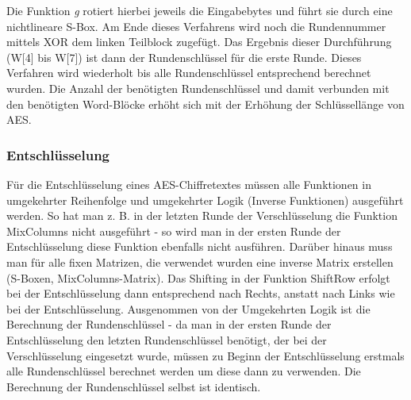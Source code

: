\documentclass[10pt, a4paper,headsepline]{scrreprt}
\begin{document}
Die Funktion \textit{g} rotiert hierbei jeweils die Eingabebytes und führt sie durch eine nichtlineare S-Box. Am Ende dieses Verfahrens wird noch die Rundennummer mittels XOR dem linken Teilblock zugefügt. Das Ergebnis dieser Durchführung (W[4] bis W[7]) ist dann der Rundenschlüssel für die erste Runde. Dieses Verfahren wird wiederholt bis alle Rundenschlüssel entsprechend berechnet wurden. Die Anzahl der benötigten Rundenschlüssel und damit verbunden mit den benötigten Word-Blöcke erhöht sich mit der Erhöhung der Schlüssellänge von AES.

\subsubsection{Entschlüsselung}
Für die Entschlüsselung eines AES-Chiffretextes müssen alle Funktionen in umgekehrter Reihenfolge und umgekehrter Logik (Inverse Funktionen) ausgeführt werden. So hat man z. B. in der letzten Runde der Verschlüsselung die Funktion MixColumns nicht ausgeführt - so wird man in der ersten Runde der Entschlüsselung diese Funktion ebenfalls nicht ausführen. Darüber hinaus muss man für alle fixen Matrizen, die verwendet wurden eine inverse Matrix erstellen (S-Boxen, MixColumns-Matrix). Das Shifting in der Funktion ShiftRow erfolgt bei der Entschlüsselung dann entsprechend nach Rechts, anstatt nach Links wie bei der Entschlüsselung. Ausgenommen von der Umgekehrten Logik ist die Berechnung der Rundenschlüssel - da man in der ersten Runde der Entschlüsselung den letzten Rundenschlüssel benötigt, der bei der Verschlüsselung eingesetzt wurde, müssen zu Beginn der Entschlüsselung erstmals alle Rundenschlüssel berechnet werden um diese dann zu verwenden. Die Berechnung der Rundenschlüssel selbst ist identisch.
\end{document}
